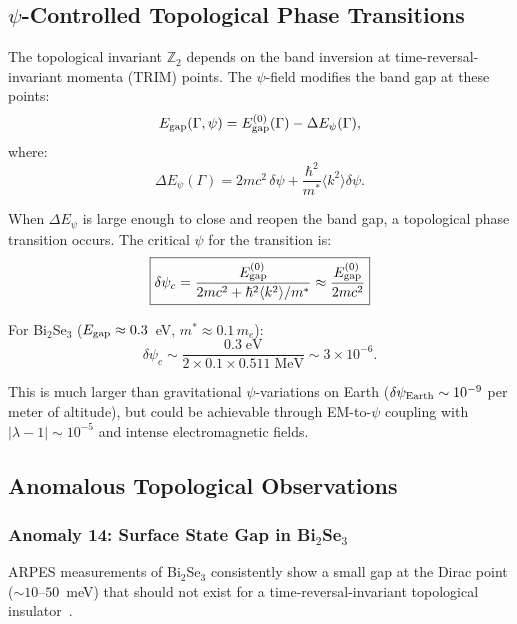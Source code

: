 \documentclass[aps,prb,twocolumn,superscriptaddress,floatfix,nofootinbib,longbibliography]{revtex4-2}
\newcommand{\avg}[1]{\langle #1 \rangle}
\begin{document}
\subsection{$\psi$-Controlled Topological Phase Transitions}

The topological invariant $\mathbb{Z}_2$ depends on the band inversion
at time-reversal-invariant momenta (TRIM) points.  The $\psi$-field
modifies the band gap at these points:
\begin{equation}
E_{\rm gap}(\Gamma,\psi) = E_{\rm gap}^{(0)}(\Gamma)
- \Delta E_\psi(\Gamma),
\label{eq:gap-psi}
\end{equation}
where:
\begin{equation}
\Delta E_\psi(\Gamma) = 2mc^2\,\delta\psi
+ \frac{\hbar^2}{m^*}\avg{k^2}\delta\psi.
\label{eq:gap-correction}
\end{equation}

When $\Delta E_\psi$ is large enough to close and reopen the band gap,
a topological phase transition occurs.  The critical $\psi$ for the
transition is:
\begin{equation}
\boxed{
\delta\psi_c = \frac{E_{\rm gap}^{(0)}}{2mc^2 + \hbar^2\avg{k^2}/m^*}
\approx \frac{E_{\rm gap}^{(0)}}{2mc^2}
}
\label{eq:psi-critical}
\end{equation}

For Bi$_2$Se$_3$ ($E_{\rm gap} \approx 0.3$~eV, $m^* \approx 0.1\,m_e$):
\begin{equation}
\delta\psi_c \sim \frac{0.3\;\text{eV}}{2 \times 0.1 \times 0.511\;\text{MeV}}
\sim 3 \times 10^{-6}.
\label{eq:psi-c-bi2se3}
\end{equation}

This is much larger than gravitational $\psi$-variations on Earth
($\delta\psi_{\rm Earth} \sim 10^{-9}$ per meter of altitude), but could
be achievable through EM-to-$\psi$ coupling with
$|\lambda - 1| \sim 10^{-5}$ and intense electromagnetic fields.

\subsection{Anomalous Topological Observations}

\subsubsection{Anomaly 14: Surface State Gap in Bi$_2$Se$_3$}

ARPES measurements of Bi$_2$Se$_3$ consistently show a small gap at the
Dirac point ($\sim 10$--$50$~meV) that should not exist for a
time-reversal-invariant topological
insulator~\cite{Chen2009,Xia2009,Bianchi2010}.
\end{document}
